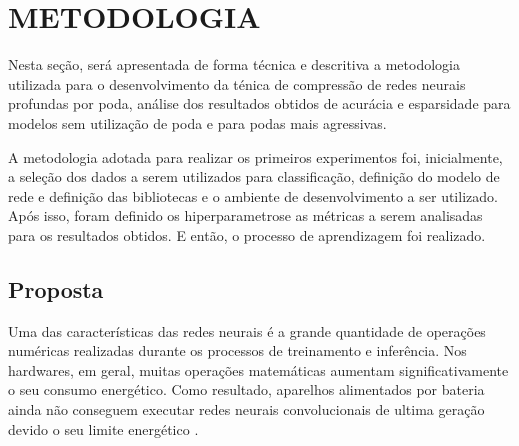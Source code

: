 \chapter[Metodologia]{METODOLOGIA}
\label{ch:cap3}

Nesta seção, será apresentada de forma técnica e descritiva a metodologia utilizada para o desenvolvimento da ténica de compressão de redes neurais profundas por poda, análise dos resultados obtidos de acurácia e esparsidade para modelos sem utilização de poda e para podas mais agressivas.

A metodologia adotada para realizar os primeiros experimentos foi, inicialmente, a seleção dos dados a serem utilizados para classificação, definição do modelo de rede e definição das bibliotecas e o ambiente de desenvolvimento a ser utilizado. Após isso, foram definido os hiperparametrose as métricas a serem analisadas para os resultados obtidos. E então, o processo de aprendizagem foi realizado.






\section{Proposta} \label{secao1}

Uma das características das redes neurais é a grande quantidade de operações numéricas realizadas durante os processos de treinamento e inferência. Nos hardwares, em geral, muitas operações matemáticas aumentam significativamente o seu consumo energético. Como resultado, aparelhos alimentados por bateria ainda não conseguem executar redes neurais convolucionais de ultima geração devido o seu limite energético \cite{yang2017}.

